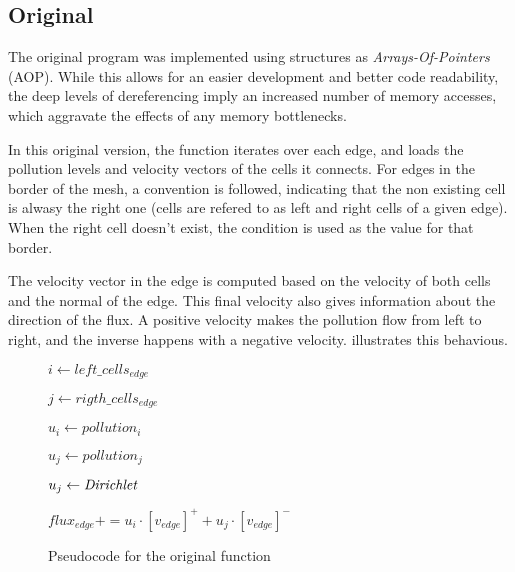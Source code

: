 \subsection{Original}
\label{sec:original}

The original \polu program was implemented using structures as \textit{Arrays-Of-Pointers} (AOP). While this allows for an easier development and better code readability, the deep levels of dereferencing imply an increased number of memory accesses, which aggravate the effects of any memory bottlenecks.

In this original version, the \computeflux function iterates over each edge, and loads the pollution levels and velocity vectors of the cells it connects. For edges in the border of the mesh, a convention is followed, indicating that the non existing cell is alwasy the right one (cells are refered to as left and right cells of a given edge). When the right cell doesn't exist, the \dirichlet condition is used as the value for that border.

The velocity vector in the edge is computed based on the velocity of both cells and the normal of the edge. This final velocity also gives information about the direction of the flux. A positive velocity makes the pollution flow from left to right, and the inverse happens with a negative velocity.  illustrates this behavious.

\begin{figure}[!htp]
	\begin{algorithmic}

			$i     \gets left\_cells_{edge}$

			$j     \gets rigth\_cells_{edge}$

			$u_{i} \gets pollution_{i}$


				$u_{j} \gets pollution_{j}$
			\Else

				$u_{j} \gets \textit{Dirichlet}$
			\EndIf


			$flux_{edge} += u_{i} \cdot [v_{edge}]^{+} + u_{j} \cdot [v_{edge}]^{-}$
		\EndFor
	\end{algorithmic}

	\caption{Pseudocode for the original \computeflux function}
	\label{alg:flux}
\end{figure}

